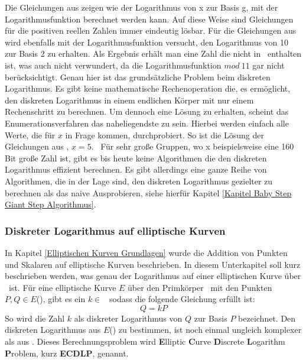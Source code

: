 		Die Gleichungen aus  zeigen wie der Logarithmus von x zur Basis g, mit der Logarithmusfunktion berechnet werden kann. Auf diese Weise sind Gleichungen für die positiven reellen Zahlen  immer eindeutig lösbar. Für die Gleichungen aus  wird ebenfalls mit der Logarithmusfunktion versucht, den Logarithmus von 10 zur Basis 2 zu erhalten. Als Ergebnis erhält man eine Zahl die nicht in \myZPStern~enthalten ist, was auch nicht verwundert, da die Logarithmusfunktion $mod~11$ gar nicht berücksichtigt. Genau hier ist das grundsätzliche Problem beim diskreten Logarithmus. Es gibt keine mathematische Rechenoperation die, es ermöglicht, den diskreten Logarithmus in einem endlichen Körper mit nur einem Rechenschritt zu berechnen. Um dennoch eine Lösung zu erhalten, scheint das Enumerationsverfahren das naheliegendste zu sein. Hierbei werden einfach alle Werte, die für $x$ in Frage kommen, durchprobiert. So ist die Lösung der Gleichungen aus , $x = 5$.~\cite{DLP:ECDLP:Probleme:und:Loesungen} Für sehr große Gruppen, wo x beispielsweise eine 160 Bit große Zahl ist, gibt es bis heute keine Algorithmen die den diskreten Logarithmus effizient berechnen.\cite{Kryptografie:in:Theorie:und:Praxis} Es gibt allerdings eine ganze Reihe von Algorithmen, die in der Lage sind, den diskreten Logarithmus gezielter zu berechnen als das naive Ausprobieren, siehe hierfür Kapitel   \ref{Kapitel Baby Step Giant Step Algorithmus}.
		
		
		\subsubsection{Diskreter Logarithmus auf elliptische Kurven}
			In Kapitel \ref{Elliptischen Kurven Grundlagen} wurde die Addition von Punkten und Skalaren auf elliptische Kurven beschrieben. In diesem Unterkapitel soll kurz beschrieben werden, was genau der Logarithmus auf einer elliptischen Kurve über \myZPStern~ist. Für eine elliptische Kurve $E$ über den Primkörper \myZPStern~mit den Punkten $P, Q \in E$(\myZPStern), gibt es ein $k \in$ \myZPStern~sodass die folgende Gleichung erfüllt ist:
			\begin{displaymath}
			Q = kP
			\end{displaymath}
			So wird die Zahl $k$ als diskreter Logarithmus von $Q$ zur Basis $P$ bezeichnet. Den diskreten Logarithmus aus $E$(\myZPStern) zu bestimmen, ist noch einmal ungleich komplexer als aus \myZPStern. Dieses Berechnungsproblem wird \textbf{E}lliptic \textbf{C}urve \textbf{D}iscrete \textbf{L}ogarithm \textbf{P}roblem, kurz \textbf{ECDLP}, genannt.

